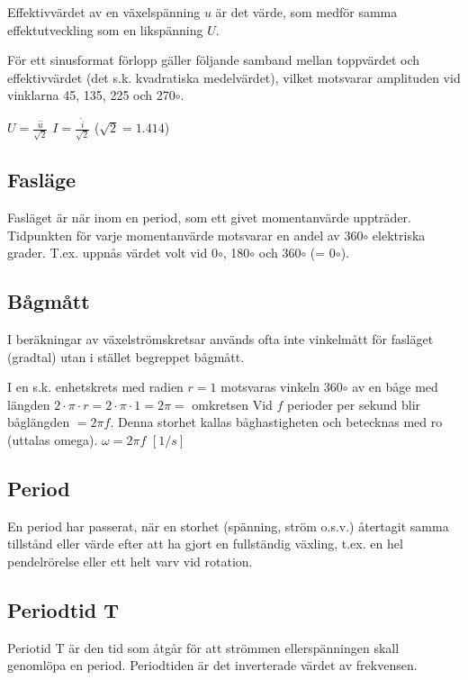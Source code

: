 \documentclass[a4paper,twoside,twocolumn,openright]{book}
\begin{document}
Effektivvärdet av en växelspänning $u$ är det värde, som medför samma effektutveckling
som en likspänning $U$.

För ett sinusformat förlopp gäller följande samband mellan toppvärdet och effektivvärdet
(det s.k. kvadratiska medelvärdet), vilket motsvarar amplituden vid vinklarna 45,
135, 225 och 270$\circ$.

$U=\frac{\hat{u}}{\sqrt{2}}$ $I=\frac{\hat{i}}{\sqrt{2}}$ ($\sqrt{2} = 1.414$)

\subsection{Fasläge}

Fasläget är när inom en period, som ett givet momentanvärde uppträder. Tidpunkten för
varje momentanvärde motsvarar en andel av 360$\circ$ elektriska grader. T.ex. uppnås
värdet volt vid 0$\circ$, 180$\circ$ och 360$\circ$ (= 0$\circ$).

\subsection{Bågmått}

I beräkningar av växelströmskretsar används ofta inte vinkelmått för fasläget (gradtal)
utan i stället begreppet bågmått.

I en s.k. enhetskrets med radien $r = 1$ motsvaras vinkeln 360$\circ$ av en båge med
längden $2 \cdot \pi \cdot r= 2 \cdot \pi \cdot 1 = 2 \pi =$ omkretsen
Vid $f$ perioder per sekund blir båglängden $= 2\pi f$. Denna storhet kallas båghastigheten
och betecknas med ro (uttalas omega).
$\omega= 2\pi f$ $[1/s]$

\subsection{Period}

En period har passerat, när en storhet (spänning, ström o.s.v.) återtagit samma tillstånd
eller värde efter att ha gjort en fullständig växling, t.ex. en hel pendelrörelse eller ett
helt varv vid rotation.

\subsection{Periodtid T}

Periotid T är den tid som åtgår för att strömmen ellerspänningen skall genomlöpa
en period. Periodtiden är det inverterade värdet av frekvensen.
\end{document}

